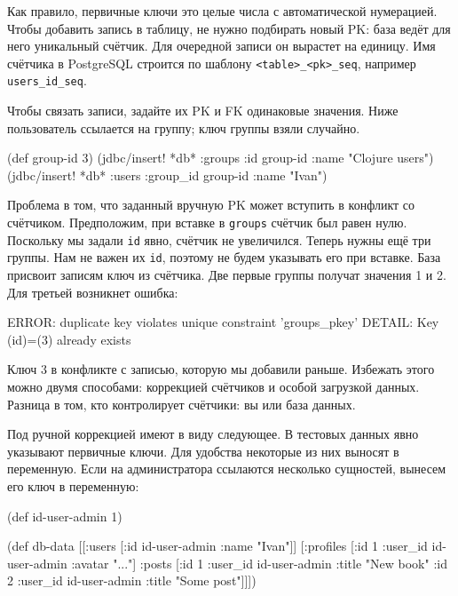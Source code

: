 
Как правило, первичные ключи это целые числа с автоматической нумерацией. Чтобы
добавить запись в таблицу, не нужно подбирать новый PK: база ведёт для него
уникальный счётчик. Для очередной записи он вырастет на единицу. Имя счётчика в
PostgreSQL строится по шаблону \verb|<table>_<pk>_seq|, например
\verb|users_id_seq|.

Чтобы связать записи, задайте их PK и FK одинаковые значения. Ниже пользователь
ссылается на группу; ключ группы взяли случайно.

\begin{english}
  \begin{clojure}
(def group-id 3)
(jdbc/insert! *db* :groups {:id group-id :name "Clojure users"})
(jdbc/insert! *db* :users {:group_id group-id :name "Ivan"})
  \end{clojure}
\end{english}

Проблема в том, что заданный вручную PK может вступить в конфликт со
счётчиком. Предположим, при вставке в \verb|groups| счётчик был равен
нулю. Поскольку мы задали \verb|id| явно, счётчик не увеличился. Теперь нужны
ещё три группы. Нам не важен их \verb|id|, поэтому не будем указывать его при
вставке. База присвоит записям ключ из счётчика. Две первые группы получат
значения 1 и 2. Для третьей возникнет ошибка:


\begin{english}
  \begin{text}
ERROR: duplicate key violates unique constraint 'groups_pkey'
DETAIL: Key (id)=(3) already exists
  \end{text}
\end{english}

Ключ 3 в конфликте с записью, которую мы добавили раньше. Избежать этого можно
двумя способами: коррекцией счётчиков и особой загрузкой данных. Разница в том,
кто контролирует счётчики: вы или база данных.

Под ручной коррекцией имеют в виду следующее. В тестовых данных явно указывают
первичные ключи. Для удобства некоторые из них выносят в переменную. Если на
администратора ссылаются несколько сущностей, вынесем его ключ в переменную:

\begin{english}
  \begin{clojure}
(def id-user-admin 1)

(def db-data
  [[:users [{:id id-user-admin :name "Ivan"}]]
   [:profiles [{:id 1 :user_id id-user-admin :avatar "..."}]
    :posts [{:id 1 :user_id id-user-admin :title "New book"}
            {:id 2 :user_id id-user-admin :title "Some post"}]]])
  \end{clojure}
\end{english}

